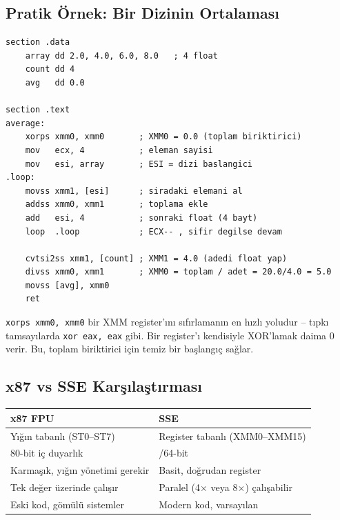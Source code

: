 \documentclass[11pt,a4paper]{article}
\newcommand{\kod}[1]{\texttt{\color{koyuGri}#1}}
\begin{document}
\subsection{Pratik Örnek: Bir Dizinin Ortalaması}

\begin{ornekkutu}
\begin{lstlisting}
section .data
    array dd 2.0, 4.0, 6.0, 8.0   ; 4 float
    count dd 4
    avg   dd 0.0

section .text
average:
    xorps xmm0, xmm0       ; XMM0 = 0.0 (toplam biriktirici)
    mov   ecx, 4           ; eleman sayisi
    mov   esi, array       ; ESI = dizi baslangici
.loop:
    movss xmm1, [esi]      ; siradaki elemani al
    addss xmm0, xmm1       ; toplama ekle
    add   esi, 4           ; sonraki float (4 bayt)
    loop  .loop            ; ECX-- , sifir degilse devam

    cvtsi2ss xmm1, [count] ; XMM1 = 4.0 (adedi float yap)
    divss xmm0, xmm1       ; XMM0 = toplam / adet = 20.0/4.0 = 5.0
    movss [avg], xmm0
    ret
\end{lstlisting}
\end{ornekkutu}

\begin{notkutu}
\kod{xorps xmm0, xmm0} bir XMM register'ını sıfırlamanın en hızlı yoludur --
tıpkı tamsayılarda \kod{xor eax, eax} gibi. Bir register'ı kendisiyle XOR'lamak
daima 0 verir. Bu, toplam biriktirici için temiz bir başlangıç sağlar.
\end{notkutu}

\subsection{x87 vs SSE Karşılaştırması}

\begin{center}
\begin{tabularx}{\textwidth}{@{}>{\raggedright\arraybackslash}X >{\raggedright\arraybackslash}X@{}}
\toprule
\rowcolor{anaMavi}\color{white}\textbf{x87 FPU} & \color{white}\textbf{SSE} \\
\midrule
Yığın tabanlı (ST0--ST7) & Register tabanlı (XMM0--XMM15) \\
\rowcolor{acikGri} 80-bit iç duyarlık & 32/64-bit \\
Karmaşık, yığın yönetimi gerekir & Basit, doğrudan register \\
\rowcolor{acikGri} Tek değer üzerinde çalışır & Paralel (4$\times$ veya 8$\times$) çalışabilir \\
Eski kod, gömülü sistemler & Modern kod, varsayılan \\
\bottomrule
\end{tabularx}
\end{center}
\end{document}
